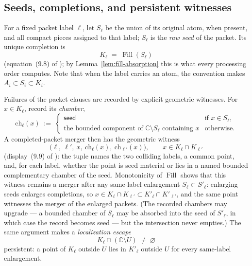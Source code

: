 \documentclass[11pt,reqno]{amsart}
\theoremstyle{definition}
\theoremstyle{remark}
\newcommand{\C}{\mathbb C}
\newcommand{\Fill}{\operatorname{Fill}}
\begin{document}
\subsection{Seeds, completions, and persistent witnesses}\label{subsec:E-witnesses}

For a fixed packet label $\ell$, let $S_\ell$ be the union of its original atom, when
present, and all compact pieces assigned to that label; $S_\ell$ is the \emph{raw
seed} of the packet. Its unique completion is
\begin{equation}\label{eq:E-completion}
K_\ell\;=\;\Fill(S_\ell)
\end{equation}
(equation~(9.8) of \cite{MWman}); by Lemma~\ref{lem:fill-absorption} this is what
every processing order computes. Note that when the label carries an atom, the
convention makes $A_i\subset S_i\subset K_i$.

Failures of the packet clauses are recorded by explicit geometric witnesses. For
$x\in K_\ell$, record its \emph{chamber},
\[
\mathrm{ch}_\ell(x)\;:=\;
\begin{cases}
\textsf{seed} & \text{if }x\in S_\ell,\\[2pt]
\text{the bounded component of }\C\setminus S_\ell\text{ containing }x
& \text{otherwise.}
\end{cases}
\]
A completed-packet merger then has the geometric witness
\begin{equation}\label{eq:E-witness}
\bigl(\ell,\ \ell',\ x,\ \mathrm{ch}_\ell(x),\ \mathrm{ch}_{\ell'}(x)\bigr),
\qquad x\in K_\ell\cap K_{\ell'}
\end{equation}
(display~(9.9) of \cite{MWman}): the tuple names the two colliding labels, a common
point, and, for each label, whether the point is seed material or lies in a named
bounded complementary chamber of the seed. Monotonicity of $\Fill$ shows that this
witness remains a merger after any same-label enlargement $S_\ell\subset S'_\ell$:
enlarging seeds enlarges completions, so
$x\in K_\ell\cap K_{\ell'}\subset K'_\ell\cap K'_{\ell'}$, and the same point
witnesses the merger of the enlarged packets. (The recorded chambers may upgrade ---
a bounded chamber of $S_\ell$ may be absorbed into the seed of $S'_\ell$, in which
case the record becomes \textsf{seed} --- but the intersection never empties.) The
same argument makes a \emph{localization escape}
\[
K_\ell\cap(\C\setminus U)\;\neq\;\varnothing
\]
persistent: a point of $K_\ell$ outside $U$ lies in $K'_\ell$ outside $U$ for every
same-label enlargement.
\end{document}
